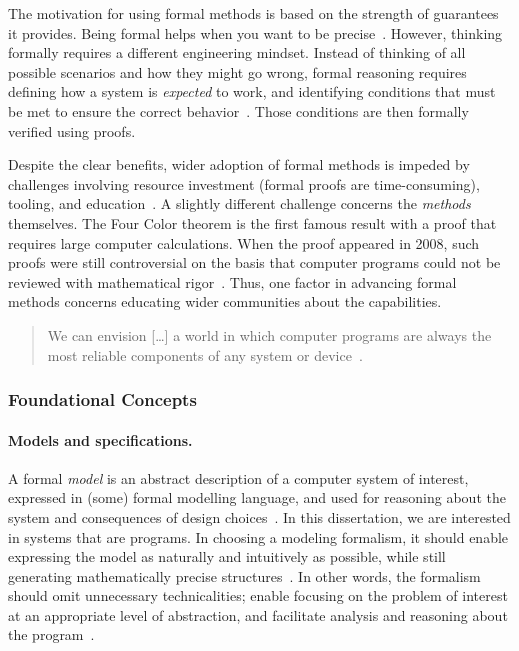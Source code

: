 The motivation for using formal methods is based on the strength of guarantees it provides.
Being formal helps when you want to be precise~\cite{leino2023}.
However, thinking formally requires a different engineering mindset.
Instead of thinking of all possible scenarios and how they might go wrong, formal reasoning requires defining how a system is \emph{expected} to work, and identifying conditions that must be met to ensure the correct behavior~\cite{aws2024}.
Those conditions are then formally verified using proofs.

Despite the clear benefits, wider adoption of formal methods is impeded by challenges involving \eg resource investment (formal proofs are time-consuming), tooling, and education~\cite{beek2024}.
A slightly different challenge concerns the \emph{methods} themselves.
The Four Color theorem is the first famous result with a proof that requires large computer calculations.
When the proof appeared in 2008, such proofs were still controversial on the basis that computer programs could not be reviewed with mathematical rigor~\cite{gonthier2008}.
Thus, one factor in advancing formal methods concerns educating wider communities about the capabilities.

\begin{quotation}
\noindent{}We can envision [\ldots] a world in which computer programs are always the most reliable components of any system or device~\cite{hoare2021}.
\end{quotation}

\subsubsection{Foundational Concepts}
\label{subsubsec:verification-concepts}

\paragraph*{Models and specifications.}
A formal \emph{model} is an abstract description of a computer system of interest, expressed in (some) formal modelling language,
and used for reasoning about the system and consequences of design choices~\cite{zave2023,olveczky2017}.
In this dissertation, we are interested in systems that are programs.
In choosing a modeling formalism, it should enable expressing the model as naturally and intuitively as possible,
while still generating mathematically precise structures~\cite{olveczky2017,beek2024}.
In other words, the formalism should omit unnecessary technicalities;
enable focusing on the problem of interest at an appropriate level of abstraction,
and facilitate analysis and reasoning about the program~\cite{olveczky2017}.

